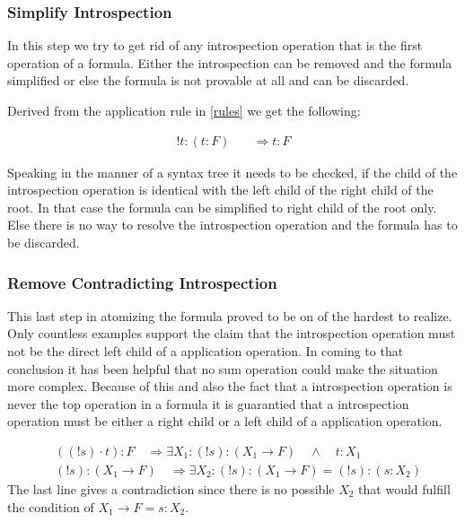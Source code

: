 

\subsubsection{Simplify Introspection}
In this step we try to get rid of any introspection operation that is the first operation of a formula. Either the introspection can be removed and the formula simplified or else the formula is not provable at all and can be discarded.

Derived from the application rule in \ref{rules} we get the following:

\begin{align}\label{sb}
	!t:(t:F) \quad & \Rightarrow t: F
\end{align}



Speaking in the manner of a syntax tree it needs to be checked, if the child of the introspection operation is identical with the left child of the right child of the root. In that case the formula can be simplified to right child of the root only. Else there is no way to resolve the introspection operation and the formula has to be discarded.

\subsubsection{Remove Contradicting Introspection}
This last step in atomizing the formula proved to be on of the hardest to realize. Only countless examples support the claim that the introspection operation must not be the direct left child of a application operation. In coming to that conclusion it has been helpful that no sum operation could make the situation more complex. Because of this and also the fact that a introspection operation is never the top operation in a formula it is guarantied that a introspection operation must be either a right child or a left child of a application operation.

\begin{align}\label{bb}
	& ((!s)\cdot t):F  \quad \Rightarrow \exists X_1 : (!s): (X_1 \rightarrow F) \quad \land \quad t: X_1\\
	& (!s): (X_1 \rightarrow F)  \quad \Rightarrow \exists X_2 : (!s):(X_1 \rightarrow F) = (!s):(s:X_2)
\end{align}
The last line gives a contradiction since there is no possible $X_2$ that would fulfill the condition of $X_1 \rightarrow F = s:X_2$.

